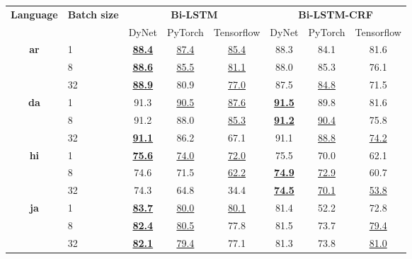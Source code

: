 \begin{table}[h!]
    \centering
    \begin{tabular}{c l c c c|c c c}
        \toprule
        \multirow{2}{*}{\bfseries Language} &
        \multirow{2}{*}{\bfseries Batch size} &
        \multicolumn{3}{c}{\bfseries Bi-LSTM} &
        \multicolumn{3}{c}{\bfseries Bi-LSTM-CRF} \\
        \cmidrule(lr){3-8}
        && DyNet & PyTorch & Tensorflow & DyNet & PyTorch & Tensorflow \\

        \cmidrule(lr){1-8}
        \multirow{3}{*}{\bfseries ar}
        &  1 & 
        \underline{\textbf{88.4}} & \underline{87.4} & \underline{85.4} &
        88.3 & 84.1 & 81.6 \\
        &  8 & 
        \underline{\textbf{88.6}} & \underline{85.5} & \underline{81.1} &
        88.0 & 85.3 & 76.1 \\
        & 32 & 
        \underline{\textbf{88.9}} & 80.9 & \underline{77.0} &
        87.5 & \underline{84.8} & 71.5 \\

        \cmidrule(lr){1-8}
        \multirow{3}{*}{\bfseries da}
        &  1 &
        91.3 & \underline{90.5} & \underline{87.6} &
        \underline{\textbf{91.5}} & 89.8 & 81.6 \\
        &  8 &
        91.2 & 88.0 & \underline{85.3} &
        \underline{\textbf{91.2}} & \underline{90.4} & 75.8 \\
        & 32 &
        \underline{\textbf{91.1}} & 86.2 & 67.1 &
        91.1 & \underline{88.8} & \underline{74.2} \\

        \cmidrule(lr){1-8}
        \multirow{3}{*}{\bfseries hi}
        &  1 &
        \underline{\textbf{75.6}} & \underline{74.0} & \underline{72.0} &
        75.5 & 70.0 & 62.1 \\
        &  8 &
        74.6 & 71.5 & \underline{62.2} &
        \underline{\textbf{74.9}} & \underline{72.9} & 60.7 \\
        & 32 &
        74.3 & 64.8 & 34.4 &
        \underline{\textbf{74.5}} & \underline{70.1} & \underline{53.8} \\

        \cmidrule(lr){1-8}
        \multirow{3}{*}{\bfseries ja}
        &  1 &
        \underline{\textbf{83.7}} & \underline{80.0} & \underline{80.1} &
        81.4 & 52.2 & 72.8 \\
        &  8 &
        \underline{\textbf{82.4}} & \underline{80.5} & 77.8 &
        81.5 & 73.7 & \underline{79.4} \\
        & 32 &
        \underline{\textbf{82.1}} & \underline{79.4} & 77.1 &
        81.3 & 73.8 & \underline{81.0} \\


\end{tabular}
\end{table}
